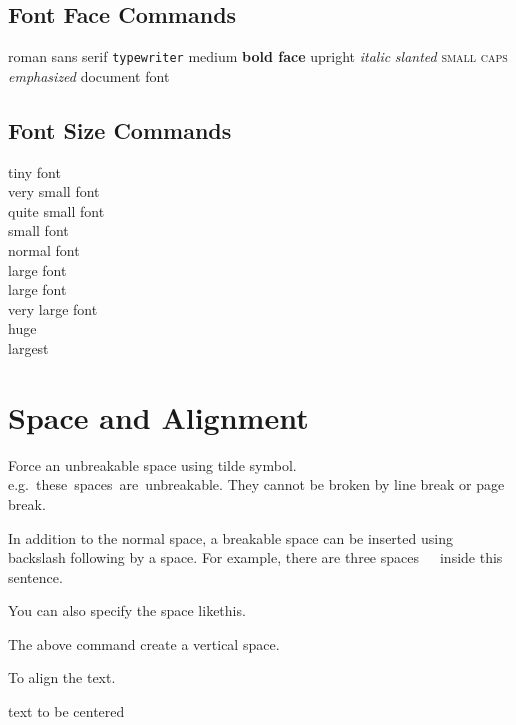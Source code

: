 \documentclass[conference]{IEEEtran}
\begin{document}
\subsection{Font Face Commands}

\textrm{roman}
\textsf{sans serif}
\texttt{typewriter}
\textmd{medium}
\textbf{bold face}
\textup{upright}
\textit{italic}
\textsl{slanted}
\textsc{small caps}
\emph{emphasized}
\textnormal{document font}

\subsection{Font Size Commands}

{\tiny tiny font}                \\
{\scriptsize very small font}    \\
{\footnotesize quite small font} \\
{\small small font}              \\
{\normalsize normal font}        \\
{\large large font}              \\
{\Large large font}              \\
{\LARGE very large font}         \\
{\huge huge}                     \\
{\Huge largest}

\section{Space and Alignment}

Force an unbreakable space using tilde symbol. e.g.~these~spaces~are~unbreakable. They cannot be broken by line break or page break.

In addition to the normal space, a breakable space can be inserted using backslash following by a space. For example, there are three spaces\ \ \ inside this sentence.

You can also specify the space like\hspace{5em}this.

\vspace{5ex}

The above command create a vertical space.

To align the text.

\begin{center}
  text to be centered
\end{center}
\end{document}
